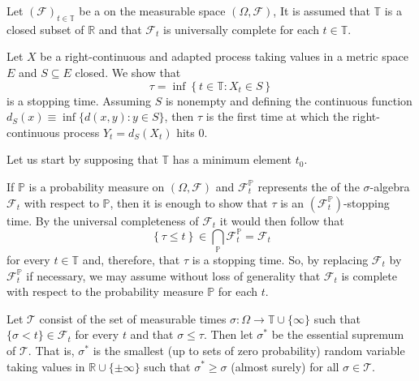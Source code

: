\documentclass[12pt]{article}
\begin{document}

Let $(\mathcal{F})_{t\in\mathbb{T}}$ be a  on the measurable space $(\Omega,\mathcal{F})$, It is assumed that $\mathbb{T}$ is a closed subset of $\mathbb{R}$ and that $\mathcal{F}_t$ is universally complete for each $t\in\mathbb{T}$.

Let $X$ be a right-continuous and adapted process taking values in a metric space $E$ and $S\subseteq E$ closed.
We show that
\begin{equation*}
\tau=\inf\left\{t\in\mathbb{T}:X_t\in S\right\}
\end{equation*}
is a stopping time. Assuming $S$ is nonempty and defining the continuous function $d_S(x)\equiv\inf\{d(x,y)\colon y\in S\}$, then $\tau$ is the first time at which the right-continuous process $Y_t=d_S(X_t)$ hits $0$.

Let us start by supposing that $\mathbb{T}$ has a minimum element $t_0$.

If $\mathbb{P}$ is a probability measure on $(\Omega,\mathcal{F})$ and $\mathcal{F}^{\mathbb{P}}_t$ represents the  of the $\sigma$-algebra $\mathcal{F}_t$ with respect to $\mathbb{P}$, then it is enough to show that $\tau$ is an $(\mathcal{F}^{\mathbb{P}}_t)$-stopping time. By the universal completeness of $\mathcal{F}_t$ it would then follow that
\begin{equation*}
\left\{\tau\le t\right\}\in\bigcap_{\mathbb{P}}\mathcal{F}^{\mathbb{P}}_t=\mathcal{F}_t
\end{equation*}
for every $t\in\mathbb{T}$ and, therefore, that $\tau$ is a stopping time.
So, by replacing $\mathcal{F}_t$ by $\mathcal{F}^{\mathbb{P}}_t$ if necessary, we may assume without loss of generality that $\mathcal{F}_t$ is complete with respect to the probability measure $\mathbb{P}$ for each $t$.

Let $\mathcal{T}$ consist of the set of measurable times $\sigma\colon\Omega\rightarrow\mathbb{T}\cup\{\infty\}$ such that $\{\sigma<t\}\in\mathcal{F}_t$ for every $t$ and that $\sigma\le\tau$. Then let $\sigma^*$ be the essential supremum of $\mathcal{T}$.
That is, $\sigma^*$ is the smallest (up to sets of zero probability) random variable taking values in $\mathbb{R}\cup\{\pm\infty\}$ such that $\sigma^*\ge\sigma$ (almost surely) for all $\sigma\in\mathcal{T}$.
\end{document}

